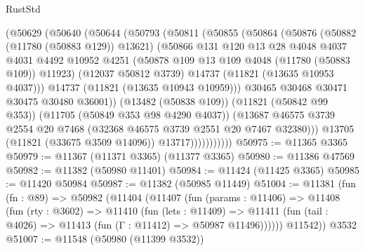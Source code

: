 \begin{lexlean}{RustStd}
\begin{coremodule}
                  (@50629
                    (@50640
                      (@50644
                        (@50793
                          (@50811
                            (@50855
                              (@50864
                                (@50876
                                  (@50882 (@11780 (@50883 @129)) @13621)
                                  (@50866
                                    @131
                                    @120
                                    @13
                                    @28
                                    @4048
                                    @4037
                                    @4031
                                    @4492
                                    @10952
                                    @4251
                                    (@50878 @109 @13 @109 @4048 (@11780 (@50883 @109)) @11923)
                                    (@12037 @50812 @3739)
                                    @14737
                                    (@11821 (@13635 @10953 @4037)))
                                  @14737
                                  (@11821 (@13635 @10943 @10959)))
                                @30465
                                @30468
                                @30471
                                @30475
                                @30480
                                @36001))
                            (@13482 (@50838 @109))
                            (@11821 (@50842 @99 @353))
                            (@11705 (@50849 @353 @98 @4290 @4037))
                            (@13687
                              @46575
                              @3739
                              @2554
                              @20
                              @7468
                              (@32368 @46575 @3739 @2551 @20 @7467 @32380)))
                          @13705
                          (@11821 (@33675 @3509 @14096))
                          @13717)))))))))))
@50975 := @11365 @3365
@50979 := @11367 (@11371 @3365) (@11377 @3365)
@50980 := @11386 @47569
@50982 := @11382 (@50980 @11401)
@50984 := @11424 (@11425 @3365)
@50985 := @11420 @50984
@50987 := @11382 (@50985 @11449)
@51004 := @11381
    (fun (fn : @89) =>
    @50982
      (@11404
        (@11407
          (fun (params : @11406) =>
          @11408
            (fun (rty : @3602) =>
            @11410
              (fun (lets : @11409) =>
              @11411 (fun (tail : @4026) => @11413 (fun (Γ : @11412) => @50987 @11496))))))
        @11542))
    @3532
@51007 := @11548 (@50980 (@11399 @3532))

\end{coremodule}
\end{lexlean}
